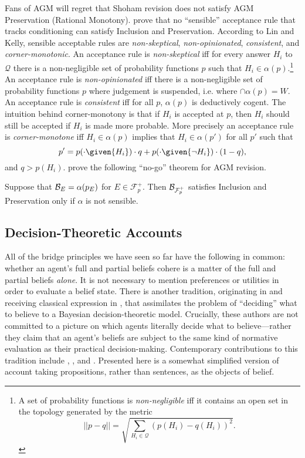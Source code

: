 Fans of AGM will regret that Shoham revision does not satisfy AGM Preservation
(Rational Monotony). \citet{lin2012propositional} prove that no ``sensible''
acceptance rule that tracks conditioning can satisfy Inclusion and
Preservation. According to Lin and Kelly, sensible acceptable rules are {\em
non-skeptical}, {\em non-opinionated}, {\em consistent}, and {\em
corner-monotonic}. An acceptance rule  is {\em non-skeptical} iff for every
answer $H_i$ to $\mathcal{Q}$ there is a non-negligible set of probability
functions $p$ such that $H_i\in \alpha(p)$.\footnote{A set of probability
functions is {\em non-negligible} iff it contains an open set in the topology
generated by the metric $$\lvert\lvert p -q \rvert\rvert = \sqrt{\sum_{H_i \in
\mathcal{Q}} (p(H_i) - q(H_i))^2}.$$ } An acceptance rule is {\em
non-opinionated} iff there is a non-negligible set of probability functions $p$
where judgement is suspended, i.e. where $\cap \alpha(p)=W$. An acceptance rule
is {\em consistent} iff for all $p$, $\alpha(p)$ is deductively cogent.  The
intuition behind corner-monotony is that if $H_i$ is accepted at $p$, then $H_i$
should still be accepted if $H_i$ is made more probable.   More precisely an
acceptance rule is {\em corner-monotone} iff  $H_i\in\alpha(p)$ implies that
$H_i \in \alpha(p')$ for all $p'$ such that $$p' = p(\cdot \given  {H_i}) \cdot
q +  p(\cdot \given {\neg H_i}) \cdot (1-q), $$ and $q>p(H_i)$.
\citet{lin2012propositional} prove the following ``no-go'' theorem for AGM
revision.

\begin{theorem}
  Suppose that $\mathcal{B}_E = \alpha(p_E)$ for $E\in\mathcal{F}_p^+$. Then
  $\mathcal{B}_{\mathcal{F}_p^+}$ satisfies Inclusion and Preservation only if $\alpha$
  is not sensible. 
\end{theorem}



\subsection{Decision-Theoretic Accounts}

All of the bridge principles we have seen so far have the following in common:
whether an agent's full and partial beliefs cohere is a matter of the full and
partial beliefs {\em alone}. It is not necessary to mention preferences or
utilities in order to evaluate a belief state. There is another tradition,
originating in \citet{hempel1962dednom} and receiving classical expression in
\citet{levi1967gambling}, that assimilates the problem of ``deciding'' what to
believe to a Bayesian decision-theoretic model. Crucially, these authors are not
committed to a picture on which agents literally decide what to believe---rather
they claim that an agent's beliefs are subject to the same kind of normative
evaluation as their practical decision-making. Contemporary contributions to
this tradition include \citet{easwaran2015truthlove},
\citet{pettigrew2016jamesian}, and \citet{dorst2017lockeans}.  Presented here is
a somewhat simplified version of  account taking
propositions, rather than sentences, as the objects of belief.

